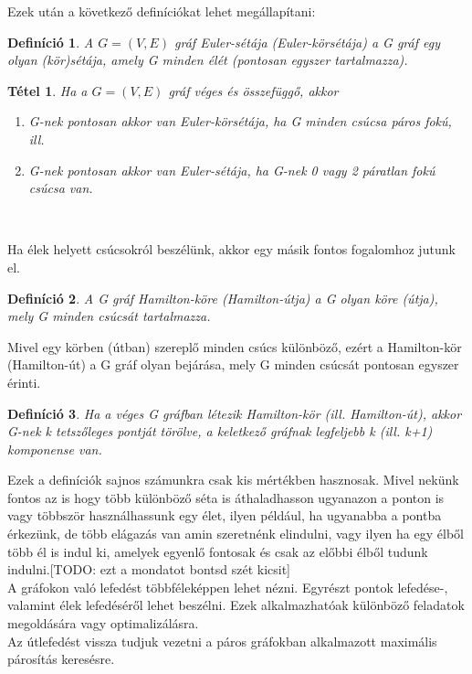 \documentclass[12pt]{article}
\newtheorem{defin}{Definíció}[section]
\newtheorem{tetel}{Tétel}[section]
\begin{document}
Ezek után a következő definíciókat lehet megállapítani:

\begin{defin}
A $G = (V,E)$ gráf Euler-sétája (Euler-körsétája) a G gráf egy olyan (kör)sétája, amely G minden élét (pontosan egyszer tartalmazza). ~\cite{szam:Fleiner}
\end{defin}

\begin{tetel}
Ha a $G = (V,E)$ gráf véges és összefüggő, akkor 
\begin{enumerate}
\item G-nek pontosan akkor van Euler-körsétája, ha G minden csúcsa páros fokú, ill.
\item G-nek pontosan akkor van Euler-sétája, ha G-nek 0 vagy 2 páratlan fokú csúcsa van.
\end{enumerate} ~\cite{szam:Fleiner}
\end{tetel}

Ha élek helyett csúcsokról beszélünk, akkor egy másik fontos fogalomhoz jutunk el.

\begin{defin}
A G gráf Hamilton-köre (Hamilton-útja) a G olyan köre (útja), mely G minden csúcsát tartalmazza. ~\cite{szam:Fleiner}
\end{defin}

Mivel egy körben (útban) szereplő minden csúcs különböző, ezért a Hamilton-kör (Hamilton-út) a G gráf olyan bejárása, mely G minden csúcsát pontosan egyszer érinti.

\begin{defin}
Ha a véges G gráfban létezik Hamilton-kör (ill. Hamilton-út), akkor G-nek k tetszőleges pontját törölve, a keletkező gráfnak legfeljebb k (ill. k+1) komponense van. ~\cite{szam:Fleiner}
\end{defin}

Ezek a definíciók sajnos számunkra csak kis mértékben hasznosak. Mivel nekünk fontos az is hogy több különböző séta is áthaladhasson ugyanazon a ponton is vagy többször használhassunk egy élet, ilyen például, ha ugyanabba a pontba érkezünk, de több elágazás van amin szeretnénk elindulni, vagy ilyen ha egy élből több él is indul ki, amelyek egyenlő fontosak és csak az előbbi élből tudunk indulni.[TODO: ezt a mondatot bontsd szét kicsit]\\ 

A gráfokon való lefedést többféleképpen lehet nézni. Egyrészt pontok lefedése-, valamint élek lefedéséről lehet beszélni. Ezek alkalmazhatóak különböző feladatok megoldására vagy optimalizálásra.\\
Az útlefedést vissza tudjuk vezetni a páros gráfokban alkalmazott maximális párosítás keresésre.\\
\end{document}
